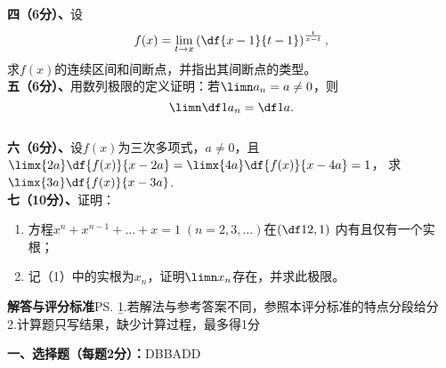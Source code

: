 
{\bf 四（6分）、}设
$$f(x)=\lim\limits_{t\to x}\left(\df{x-1}{t-1}\right)^{\frac{t}{x-t}},$$
求$f(x)$的连续区间和间断点，并指出其间断点的类型。\\[6cm]

\newpage
\vspace*{2cm}
{\bf 五（6分）、}用数列极限的定义证明：若$\limn a_n=a\ne0$，则
$$\limn\df1{a_n}=\df1a.$$\\[8cm]


{\bf 六（6分）、}设$f(x)$为三次多项式，$a\ne 0$，且
$\limx{2a}\df{f(x)}{x-2a}=\limx{4a}\df{f(x)}{x-4a}=1$，
求$\limx{3a}\df{f(x)}{x-3a}$.\\[8cm]

\newpage
\vspace*{3cm}
{\bf 七（10分）、}证明：
\begin{enumerate}[(1)]
  \setlength{\itemindent}{1cm}
  \item 方程$x^n+x^{n-1}+\ldots+x=1\;(n=2,3,\ldots)$在$\left(\df12,1\right)$
  内有且仅有一个实根；
  \item 记（1）中的实根为$x_n$，证明$\limn x_n$存在，并求此极限。
\end{enumerate}

\newpage

\begin{center}
	{\Large\bf 解答与评分标准}\ps{\b 1.若解法与参考答案不同，参照本评分标准的特点分段给分\\
	2.计算题只写结果，缺少计算过程，最多得1分}
\end{center}

{\bf 一、选择题（每题2分）：}\quad D\quad B\quad B\quad A\quad D\quad D

